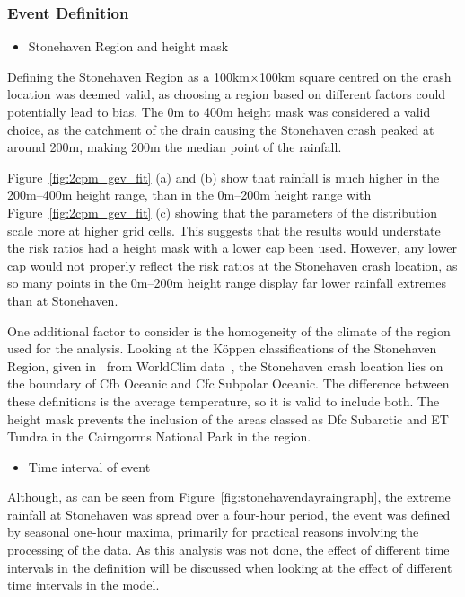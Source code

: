 \subsubsection{Event Definition}

\begin{itemize} \item Stonehaven Region and height mask \end{itemize}

Defining the Stonehaven Region as a 100km$\times$100km square centred on the crash location was deemed valid,
    as choosing a region based on different factors could potentially lead to bias.
The 0m to 400m height mask was considered a valid choice,
    as the catchment of the drain causing the Stonehaven crash peaked at around 200m,
    making 200m the median point of the rainfall.

Figure~\ref{fig:2cpm_gev_fit} (a) and (b) show that rainfall is much higher in the 200m--400m height range,
    than in the 0m--200m height range
    with Figure~\ref{fig:2cpm_gev_fit} (c) showing that the parameters of the distribution scale more at higher grid cells.
This suggests that the results would understate the risk ratios had a height mask with a lower cap been used.
However, any lower cap would not properly reflect the risk ratios at the Stonehaven crash location,
    as so many points in the 0m--200m height range display far lower rainfall extremes than at Stonehaven.

One additional factor to consider is the homogeneity of the climate of the region used for the analysis.
Looking at the K\"oppen classifications of the Stonehaven Region, given in~\cite{Koppen_file} from WorldClim data~\cite{worldclim},
    the Stonehaven crash location lies on the boundary of Cfb Oceanic and Cfc Subpolar Oceanic.
The difference between these definitions is the average temperature,
    so it is valid to include both.
The height mask prevents the inclusion of the areas classed as Dfc Subarctic and ET Tundra in the Cairngorms National Park
    in the region.

\begin{itemize}\item Time interval of event\end{itemize}

Although, as can be seen from Figure~\ref{fig:stonehavendayraingraph},
    the extreme rainfall at Stonehaven was spread over a four-hour period,
    the event was defined by seasonal one-hour maxima,
    primarily for practical reasons involving the processing of the data.
As this analysis was not done,
    the effect of different time intervals in the definition will be discussed when looking at the effect of
    different time intervals in the model.

